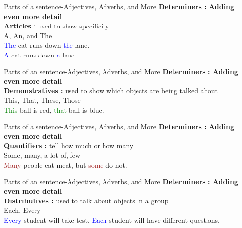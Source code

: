 \documentclass{beamer}
\begin{document}
\begin{frame}{Parts of a sentence-Adjectives, Adverbs, and More}
\centering
\textbf{Determiners : Adding even more detail}\\
\vspace{0.2in}
\textbf{Articles :} used to show specificity\\
\vspace{0.2in}
A, An, and The\\
\vspace{0.2in}
\textcolor{blue}{The} cat runs down \textcolor{blue}{the} lane.\\
\vspace{0.2in}
\textcolor{blue}{A} cat runs down \textcolor{blue}{a} lane.\\    
\end{frame}
\begin{frame}{Parts of an sentence-Adjectives, Adverbs, and More}
\centering
\textbf{Determiners : Adding even more detail}\\
\vspace{0.2in}
\textbf{Demonstratives :} used to show which objects are being talked about\\
\vspace{0.2in}
This, That, These, Those\\
\vspace{0.2in}
\textcolor{green}{This} ball is red, \textcolor{green}{that} ball is blue.\\    
\end{frame}
\begin{frame}{Parts of a sentence-Adjectives, Adverbs, and More}
\centering
\textbf{Determiners : Adding even more detail}\\
\vspace{0.2in}
\textbf{Quantifiers :} tell how much or how many\\
\vspace{0.2in}
Some, many, a lot of, few\\
\vspace{0.2in}
\textcolor{brown}{Many} people eat meat, but \textcolor{brown}{some} do not.


    
\end{frame}
\begin{frame}{Parts of an sentence-Adjectives, Adverbs, and More}
\centering
\textbf{Determiners : Adding even more detail}\\
\vspace{0.2in}
\textbf{Distributives :} used to talk about objects in a group\\
\vspace{0.2in}
Each, Every\\
\vspace{0.2in}
\textcolor{blue}{Every} student will take test, \textcolor{blue}{Each} student will have different questions.    
\end{frame}
\end{document}
